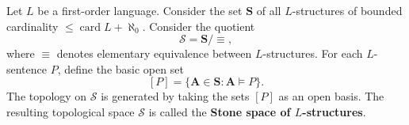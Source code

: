 Let $L$ be a first-order language. Consider the set $\mathbf{S}$ of all $L$-structures of bounded cardinality $\leq \operatorname{card} L + \aleph_0$. Consider the quotient
$$\mathcal{S} = \mathbf{S} / {\equiv},$$
where $\equiv$ denotes elementary equivalence between $L$-structures. For each $L$-sentence $P$, define the basic open set
$$[P] = \{ \mathbf{A} \in \mathbf{S} : \mathbf{A} \vDash P \}.$$
The topology on $\mathcal{S}$ is generated by taking the sets $[P]$ as an open basis. The resulting topological space $\mathcal{S}$ is called the \textbf{Stone space of $L$-structures}.

